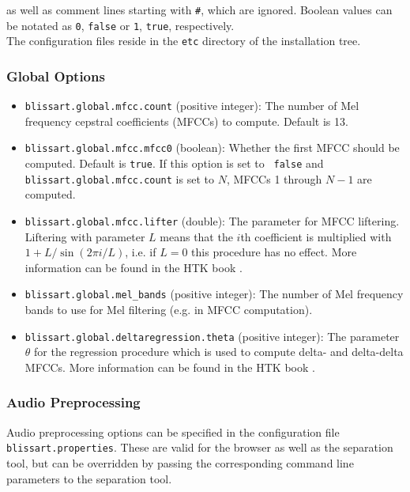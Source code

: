 as well as comment lines starting with {\tt \#}, which are ignored. Boolean
values can be notated as {\tt 0}, {\tt false} or {\tt 1}, {\tt true},
respectively.\\

The configuration files reside in the {\tt etc} directory of the installation
tree.


\subsubsection{Global Options}
\label{section:ConfigFileGlobal}

\begin{itemize}
  \item   {\tt blissart.global.mfcc.count} (positive integer): The number of
    Mel frequency cepstral coefficients (MFCCs) to compute. Default is 13.
  \item   {\tt blissart.global.mfcc.mfcc0} (boolean): Whether the first MFCC
    should be computed. Default is {\tt true}. If this option is set to {\tt
    false} and {\tt blissart.global.mfcc.count} is set to $N$, MFCCs 1 through 
    $N-1$ are computed.
  \item   {\tt blissart.global.mfcc.lifter} (double): The parameter for MFCC
    liftering. Liftering with parameter $L$ means that the $i$th
    coefficient is multiplied with $1 + L / \sin(2\pi i / L)$, i.e. if
    $L=0$ this procedure has no effect. More information can be found in
    the HTK book \cite{HTKBook}.
  \item   {\tt blissart.global.mel\_bands} (positive integer): The number of
    Mel frequency bands to use for Mel filtering (e.g. in MFCC computation).
  \item   {\tt blissart.global.deltaregression.theta} (positive integer): The
    parameter $\theta$ for the regression procedure which is used to
    compute delta- and delta-delta MFCCs. More information can be found in
    the HTK book \cite{HTKBook}.
\end{itemize}


\subsubsection{Audio Preprocessing}
\label{section:ConfigFileAudio}

Audio preprocessing options can be specified in the configuration file {\tt
  blissart.properties}. These are valid for the browser as well as the
separation tool, but can be overridden by passing the corresponding command line
parameters to the separation tool.

